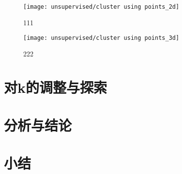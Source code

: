 \begin{figure}[htbp]
    \centering
    \texttt{[image: unsupervised/cluster using points\_2d]}
    \caption[]{\label{fig:cluster2d}111}
\end{figure}
\begin{figure}[htbp]
    \centering
    \texttt{[image: unsupervised/cluster using points\_3d]}
    \caption[]{\label{fig:cluster3d}222}
\end{figure}
\section{对k的调整与探索}
\section{分析与结论}
\section{小结}